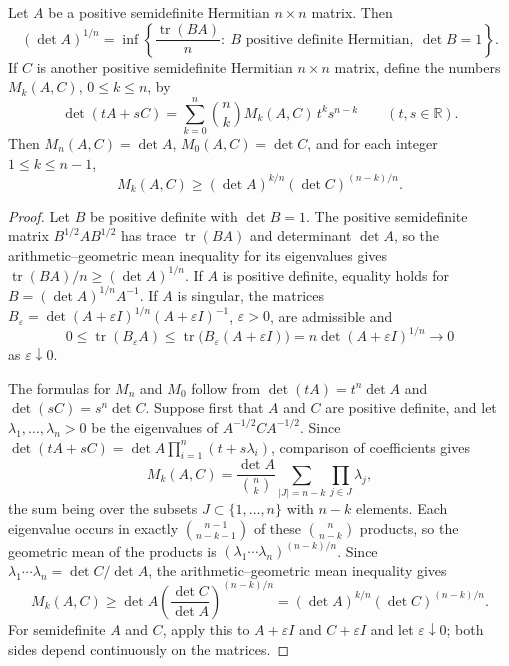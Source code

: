 \begin{lemma}\label{lem:determinant-linearization-mixed}
Let $A$ be a positive semidefinite Hermitian $n\times n$ matrix. Then
\[
 (\det A)^{1/n}=\inf\left\{\frac{\operatorname{tr}(BA)}n:\ B\text{ positive definite Hermitian},\ \det B=1\right\}.
\]
If $C$ is another positive semidefinite Hermitian $n\times n$ matrix, define the numbers $M_k(A,C)$, $0\le k\le n$, by
\[
 \det(tA+sC)=\sum_{k=0}^n\binom nk M_k(A,C)\,t^ks^{n-k}\qquad(t,s\in\mathbb R).
\]
Then $M_n(A,C)=\det A$, $M_0(A,C)=\det C$, and for each integer $1\le k\le n-1$,
\[
 M_k(A,C)\ge(\det A)^{k/n}(\det C)^{(n-k)/n}.
\]
\end{lemma}
\begin{proof}
Let $B$ be positive definite with $\det B=1$. The positive semidefinite matrix $B^{1/2}AB^{1/2}$ has trace $\operatorname{tr}(BA)$ and determinant $\det A$, so the arithmetic--geometric mean inequality for its eigenvalues gives $\operatorname{tr}(BA)/n\ge(\det A)^{1/n}$. If $A$ is positive definite, equality holds for $B=(\det A)^{1/n}A^{-1}$. If $A$ is singular, the matrices $B_\varepsilon=\det(A+\varepsilon I)^{1/n}(A+\varepsilon I)^{-1}$, $\varepsilon>0$, are admissible and
\[
 0\le\operatorname{tr}(B_\varepsilon A)\le\operatorname{tr}\bigl(B_\varepsilon(A+\varepsilon I)\bigr)=n\det(A+\varepsilon I)^{1/n}\longrightarrow0
\]
as $\varepsilon\downarrow0$.

The formulas for $M_n$ and $M_0$ follow from $\det(tA)=t^n\det A$ and $\det(sC)=s^n\det C$. Suppose first that $A$ and $C$ are positive definite, and let $\lambda_1,\ldots,\lambda_n>0$ be the eigenvalues of $A^{-1/2}CA^{-1/2}$. Since $\det(tA+sC)=\det A\prod_{i=1}^n(t+s\lambda_i)$, comparison of coefficients gives
\[
 M_k(A,C)=\frac{\det A}{\binom nk}\sum_{|J|=n-k}\prod_{j\in J}\lambda_j,
\]
the sum being over the subsets $J\subset\{1,\ldots,n\}$ with $n-k$ elements. Each eigenvalue occurs in exactly $\binom{n-1}{n-k-1}$ of these $\binom n{n-k}$ products, so the geometric mean of the products is $(\lambda_1\cdots\lambda_n)^{(n-k)/n}$. Since $\lambda_1\cdots\lambda_n=\det C/\det A$, the arithmetic--geometric mean inequality gives
\[
 M_k(A,C)\ge\det A\left(\frac{\det C}{\det A}\right)^{(n-k)/n}=(\det A)^{k/n}(\det C)^{(n-k)/n}.
\]
For semidefinite $A$ and $C$, apply this to $A+\varepsilon I$ and $C+\varepsilon I$ and let $\varepsilon\downarrow0$; both sides depend continuously on the matrices.
\end{proof}

